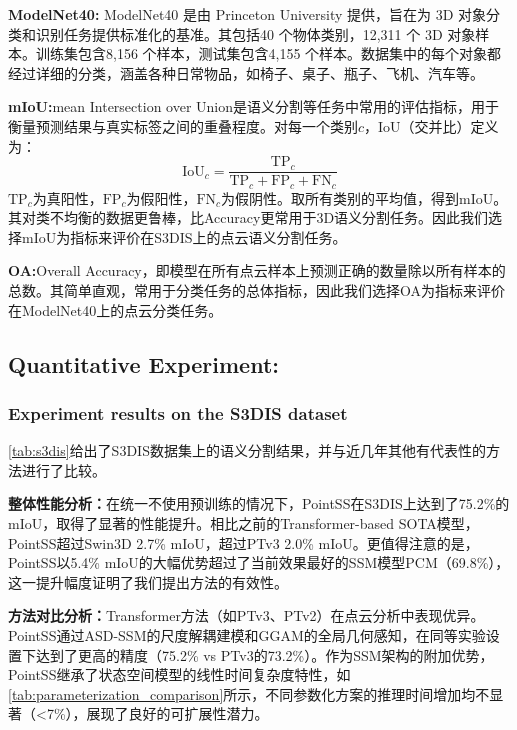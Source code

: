 \documentclass[preprint,12pt]{elsarticle}
\begin{document}
\textbf{ModelNet40:}
ModelNet40 是由 Princeton University 提供，旨在为 3D 对象分类和识别任务提供标准化的基准。其包括40 个物体类别，12,311 个 3D 对象样本。训练集包含8,156 个样本，测试集包含4,155 个样本。数据集中的每个对象都经过详细的分类，涵盖各种日常物品，如椅子、桌子、瓶子、飞机、汽车等。


\textbf{mIoU:}mean Intersection over Union是语义分割等任务中常用的评估指标，用于衡量预测结果与真实标签之间的重叠程度。对每一个类别$c$，IoU（交并比）定义为：\begin{equation}\mathrm{IoU}_c=\frac{\mathrm{TP}_c}{\mathrm{TP}_c+\mathrm{FP}_c+\mathrm{FN}_c}\end{equation}
$\mathrm{TP}_{c}$为真阳性，$\mathrm{FP}_{c}$为假阳性，$\mathrm{FN}_{c}$为假阴性。取所有类别的平均值，得到mIoU。其对类不均衡的数据更鲁棒，比Accuracy更常用于3D语义分割任务。因此我们选择mIoU为指标来评价在S3DIS上的点云语义分割任务。

\textbf{OA:}Overall Accuracy，即模型在所有点云样本上预测正确的数量除以所有样本的总数。其简单直观，常用于分类任务的总体指标，因此我们选择OA为指标来评价在ModelNet40上的点云分类任务。

\subsection{Quantitative Experiment:}
\subsubsection{Experiment results on the S3DIS dataset}
\cref{tab:s3dis}给出了S3DIS数据集上的语义分割结果，并与近几年其他有代表性的方法进行了比较。

\textbf{整体性能分析：}在统一不使用预训练的情况下，PointSS在S3DIS上达到了75.2\%的mIoU，取得了显著的性能提升。相比之前的Transformer-based SOTA模型，PointSS超过Swin3D 2.7\% mIoU，超过PTv3 2.0\% mIoU。更值得注意的是，PointSS以5.4\% mIoU的大幅优势超过了当前效果最好的SSM模型PCM（69.8\%），这一提升幅度证明了我们提出方法的有效性。

\textbf{方法对比分析：}Transformer方法（如PTv3、PTv2）在点云分析中表现优异。PointSS通过ASD-SSM的尺度解耦建模和GGAM的全局几何感知，在同等实验设置下达到了更高的精度（75.2\% vs PTv3的73.2\%）。作为SSM架构的附加优势，PointSS继承了状态空间模型的线性时间复杂度特性，如\cref{tab:parameterization_comparison}所示，不同参数化方案的推理时间增加均不显著（<7\%），展现了良好的可扩展性潜力。
\end{document}
